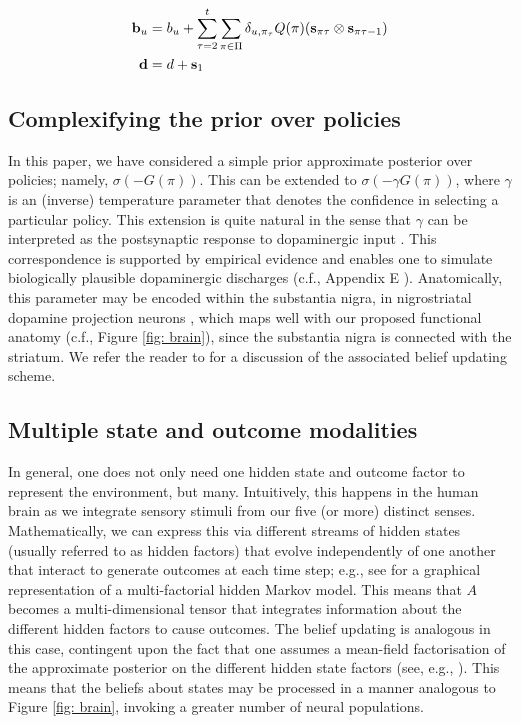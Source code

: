 \documentclass[review,12pt,authoryear]{elsarticle}
\begin{document}
\begin{align}
    \bold b_u &= b_u + \sum_{\tau =2}^t \sum_{\pi \in \Pi} \delta_{u, \pi_\tau}  Q(\pi)(\bold s_{\pi\tau} \otimes \bold s_{\pi\tau-1}) \\
    \bold d&= d +\bold s_1
\end{align}


\subsection{Complexifying the prior over policies}
\label{appendix: gamma}

In this paper, we have considered a simple prior approximate posterior over policies; namely, $\sigma (-G(\pi))$. This can be extended to $\sigma (-\gamma G(\pi))$, where $\gamma$ is an (inverse) temperature parameter that denotes the confidence in selecting a particular policy. This extension is quite natural in the sense that $\gamma$ can be interpreted as the postsynaptic response to dopaminergic input \citep{fitzgeraldDopamineRewardLearning2015,fristonAnatomyChoiceDopamine2014}. This correspondence is supported by empirical evidence \citep{schwartenbeckDopaminergicMidbrainEncodes2015} and enables one to simulate biologically plausible dopaminergic discharges (c.f., Appendix E \citep{fristonActiveInferenceProcess2017}). Anatomically, this parameter may be encoded within the substantia nigra, in nigrostriatal dopamine projection neurons \citep{schwartenbeckDopaminergicMidbrainEncodes2015}, which maps well with our proposed functional anatomy (c.f., Figure \ref{fig: brain}), since the substantia nigra is connected with the striatum. We refer the reader to \citep{fristonActiveInferenceProcess2017} for a discussion of the associated belief updating scheme.

 
\subsection{Multiple state and outcome modalities}
\label{appendix: multiple state outcome}

In general, one does not only need one hidden state and outcome factor to represent the environment, but many. Intuitively, this happens in the human brain as we integrate sensory stimuli from our five (or more) distinct senses. Mathematically, we can express this via different streams of hidden states (usually referred to as hidden factors) that evolve independently of one another that interact to generate outcomes at each time step; e.g., see \citet[Figure 9]{jordanIntroductionVariationalMethods1998} for a graphical representation of a multi-factorial hidden Markov model. This means that $A$ becomes a multi-dimensional tensor that integrates information about the different hidden factors to cause outcomes. The belief updating is analogous in this case, contingent upon the fact that one assumes a mean-field factorisation of the approximate posterior on the different hidden state factors (see, e.g., \citep{mirzaSceneConstructionVisual2016,fristonFunctionalAnatomyTime2016}). This means that the beliefs about states may be processed in a manner analogous to Figure \ref{fig: brain}, invoking a greater number of neural populations.
\end{document}
